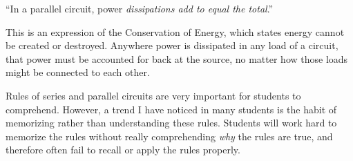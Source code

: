 \vskip 30pt

\noindent
``In a parallel circuit, power {\it dissipations add to equal the total}.''

\vskip 10pt

This is an expression of the Conservation of Energy, which states energy cannot be created or destroyed.  Anywhere power is dissipated in any load of a circuit, that power must be accounted for back at the source, no matter how those loads might be connected to each other.







Rules of series and parallel circuits are very important for students to comprehend.  However, a trend I have noticed in many students is the habit of memorizing rather than understanding these rules.  Students will work hard to memorize the rules without really comprehending {\it why} the rules are true, and therefore often fail to recall or apply the rules properly.




